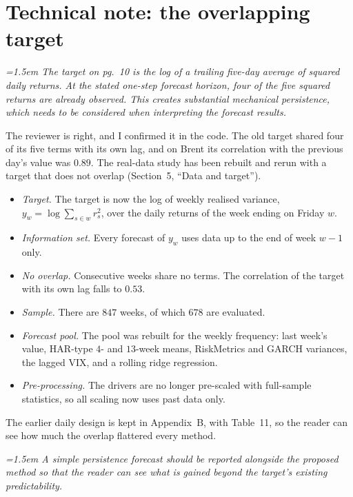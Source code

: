 \documentclass[12pt]{article}
\newenvironment{reviewer}{\par\begingroup\itshape\color{black!70}\leftskip=1.5em}{\par\endgroup}
\begin{document}
\section*{Technical note: the overlapping target}

\begin{reviewer}
The target on pg.~10 is the log of a trailing five-day average of squared daily
returns. At the stated one-step forecast horizon, four of the five squared returns
are already observed. This creates substantial mechanical persistence, which needs to
be considered when interpreting the forecast results.
\end{reviewer}

The reviewer is right, and I confirmed it in the code. The old target shared four of
its five terms with its own lag, and on Brent its correlation with the previous day's
value was $0.89$. The real-data study has been rebuilt and rerun with a target that
does not overlap (Section~5, ``Data and target'').
\begin{itemize}
\item \emph{Target.} The target is now the log of weekly realised variance,
$y_w=\log\sum_{s\in w}r_s^2$, over the daily returns of the week ending on Friday $w$.
\item \emph{Information set.} Every forecast of $y_w$ uses data up to the end of week
$w-1$ only.
\item \emph{No overlap.} Consecutive weeks share no terms. The correlation of the
target with its own lag falls to $0.53$.
\item \emph{Sample.} There are $847$ weeks, of which $678$ are evaluated.
\item \emph{Forecast pool.} The pool was rebuilt for the weekly frequency: last week's
value, HAR-type $4$- and $13$-week means, RiskMetrics and GARCH variances, the lagged
VIX, and a rolling ridge regression.
\item \emph{Pre-processing.} The drivers are no longer pre-scaled with full-sample
statistics, so all scaling now uses past data only.
\end{itemize}
The earlier daily design is kept in Appendix~B, with Table~11, so the reader can see
how much the overlap flattered every method.

\begin{reviewer}
A simple persistence forecast should be reported alongside the proposed method so
that the reader can see what is gained beyond the target's existing predictability.
\end{reviewer}
\end{document}
